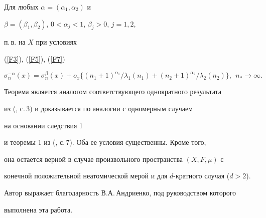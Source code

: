 \begin{cornonum}


Для любых $\alpha =(\alpha_1,\alpha_2)$ и


$\beta =(\beta_1,\beta_2)$, $0<\alpha_j<1$, $\beta_j>0$, $j=1,2$,


п.\,в. на $X$ при условиях


(\ref{F3}), (\ref{F5}), (\ref{F7})


$$




\sigma_n^{-\alpha }(x)=\sigma_n^{\beta }(x)+o_x\{(n_1+1)^{\alpha_1}/\lambda


_1(n_1)+(n_2+1)^{\alpha_2}/\lambda_2(n_2)\},\ \ n_*\to \infty .




$$


\end{cornonum}





Теорема является аналогом соответствующего однократного результата


из (\cite{l2}, с.\,3) и доказывается по аналогии с одномерным случаем


на основании следствия 1


и теоремы 1 из (\cite{l5}, с.\,7). Оба ее условия существенны. Кроме того,


она остается верной в случае произвольного пространства $(X,F,\mu )$ с


конечной положительной неатомической мерой и для $d$-кратного случая ($d>2$).





Автор выражает благодарность В.А.\,Андриенко, под руководством которого 


выполнена эта работа.





